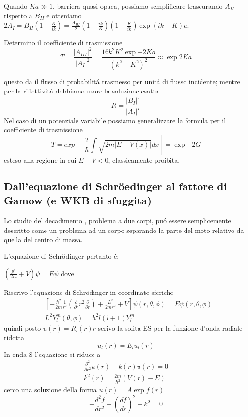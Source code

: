 Quando $Ka\gg1$, barriera quasi opaca, possiamo semplificare trascurando $A_{II}$ rispetto a $B_{II}$ e otteniamo $2A_I=B_{II}(1-\frac{K}{ik})=\frac{A_{III}}{2}(1-\frac{ik}{K})(1-\frac{K}{ik})\exp{(ik+K)a}$.

Determino il coefficiente di trasmissione
\begin{equation*}
T=\frac{|A_{III}|^2}{|A_I|^2}=\frac{16k^2K^2\exp{-2Ka}}{(k^2+K^2)^2}\approx\exp{2Ka}
\end{equation*}

questo da il flusso di probabilit\'a trasmesso per unit\'a di flusso incidente; mentre per la riflettivit\'a dobbiamo usare la soluzione esatta
\begin{equation*}
R=\frac{|B_I|^2}{|A_I|^2}
\end{equation*} 
Nel caso di un potenziale variabile possiamo generalizzare la formula per il coefficiente di trasmissione
\begin{equation*}
T=exp[-\frac{2}{\hbar}\int\sqrt{2m|E-V(x)|}dx]=\exp{-2G}
\end{equation*}
esteso alla regione in cui $E-V<0$, classicamente proibita.

\subsection{Dall'equazione di Schr\"oedinger al fattore di Gamow (e WKB di sfuggita)}

Lo studio del decadimento \Ra, problema a due corpi, pu\'o essere semplicemente descritto come un problema ad un corpo separando la parte del moto relativo da quella del centro di massa.

L'equazione di Schr\"odinger pertanto \'e:

$(\frac{p^2}{2m}+V)\psi=E\psi$ dove 

Riscrivo l'equazione di Schr\"odinger in coordinate sferiche
\begin{align*}
&[-\frac{\hbar^2}{2m}\frac{1}{r^2}(\frac{\partial}{\partial r}r^2\frac{\partial}{\partial r})+\frac{L^2}{2mr^2}+V]\psi(r,\theta,\phi)=E\psi(r,\theta,\phi)\\
&L^2Y_l^m(\theta,\phi)=\hbar^2l(l+1)Y_l^m
\end{align*}
quindi posto $u(r)=R_l(r)r$ scrivo la solita ES per la funzione d'onda radiale ridotta
\begin{equation*}
[-\frac{\hbar^2}{2m}\frac{\partial^2}{\partial r^2}+\frac{\hbar^2}{2mr^2}l(l+1)+V(r)]u_l(r)=E_lu_l(r)
\end{equation*}
In onda S l'equazione si riduce a
\begin{align*}
\frac{\partial^2}{\partial r^2}u(r)-k(r)u(r)=0\\
k^2(r)=\frac{2m}{\hbar^2}(V(r)-E)
\end{align*}
cerco una soluzione della forma $u(r)=A\exp{f(r)}$
\begin{equation*}
-\frac{d^2f}{dr^2}+(\frac{df}{dr})^2-k^2=0
\end{equation*}

